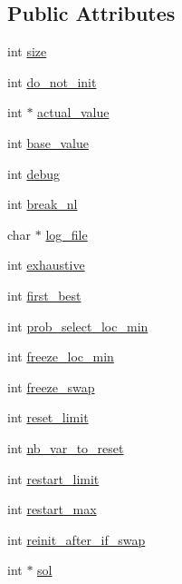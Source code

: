 \subsection*{\-Public \-Attributes}
\begin{DoxyCompactItemize}
\item 
int \hyperlink{classAdData_a510cbe13195442be22c03caee16d19a9}{size}
\item 
int \hyperlink{classAdData_a988620949ce258a678030e920ef1d924}{do\-\_\-not\-\_\-init}
\item 
int $\ast$ \hyperlink{classAdData_aa07e6b6e9c15152e0efa6f3b1e5e6934}{actual\-\_\-value}
\item 
int \hyperlink{classAdData_a156da702ebf4837590f4854dc7c2bc81}{base\-\_\-value}
\item 
int \hyperlink{classAdData_afeb196198499026a227948b01f5d6676}{debug}
\item 
int \hyperlink{classAdData_a9c23c8706e4564395bb087d08e05f1f0}{break\-\_\-nl}
\item 
char $\ast$ \hyperlink{classAdData_ad143f3006862ac20445480279ecc119b}{log\-\_\-file}
\item 
int \hyperlink{classAdData_aaa20f10e31a32e68a8ba89ba6cb45418}{exhaustive}
\item 
int \hyperlink{classAdData_a90287e9e24c3283b02afa11547fd09a8}{first\-\_\-best}
\item 
int \hyperlink{classAdData_ae3faabad700f63af17109c86e844a479}{prob\-\_\-select\-\_\-loc\-\_\-min}
\item 
int \hyperlink{classAdData_a56f6a4d4c38156e5583502dec2b84d98}{freeze\-\_\-loc\-\_\-min}
\item 
int \hyperlink{classAdData_a81ecb44f370042dbc83a2fe0d55a8919}{freeze\-\_\-swap}
\item 
int \hyperlink{classAdData_ad412ba14ea9c314cb3628f1f370d3857}{reset\-\_\-limit}
\item 
int \hyperlink{classAdData_a060111a11c54ed717c9669a5baa61cdb}{nb\-\_\-var\-\_\-to\-\_\-reset}
\item 
int \hyperlink{classAdData_a58c6bec33a86d9151b9830f604244211}{restart\-\_\-limit}
\item 
int \hyperlink{classAdData_a1dbcbad666cf9f7fa881706082cb70a7}{restart\-\_\-max}
\item 
int \hyperlink{classAdData_a0a5bced280616c57eeaf20d78eabd538}{reinit\-\_\-after\-\_\-if\-\_\-swap}
\item 
int $\ast$ \hyperlink{classAdData_a0b104c9abf7d64d2bbeb330dd237fd92}{sol}
\item 

\end{DoxyCompactItemize}
